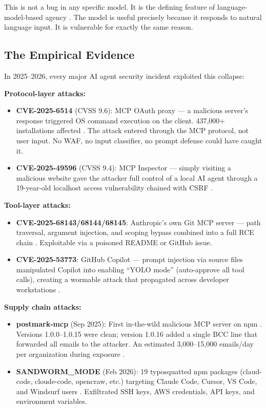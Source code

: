 \documentclass[11pt,letterpaper]{article}
\begin{document}
This is not a bug in any specific model. It is the defining feature of language-model-based agency \cite{promptinjsurvey}. The model is useful precisely because it responds to natural language input. It is vulnerable for exactly the same reason.


\subsection{The Empirical Evidence}

In 2025--2026, every major AI agent security incident exploited this collapse:

\textbf{Protocol-layer attacks:}

\begin{itemize}
\item \textbf{CVE-2025-6514} (CVSS 9.6): MCP OAuth proxy --- a malicious server's response triggered OS command execution on the client. 437,000+ installations affected \cite{cve6514}. The attack entered through the MCP protocol, not user input. No WAF, no input classifier, no prompt defense could have caught it.
\item \textbf{CVE-2025-49596} (CVSS 9.4): MCP Inspector --- simply visiting a malicious website gave the attacker full control of a local AI agent through a 19-year-old localhost access vulnerability chained with CSRF \cite{cve49596}.
\end{itemize}

\textbf{Tool-layer attacks:}

\begin{itemize}
\item \textbf{CVE-2025-68143/68144/68145}: Anthropic's own Git MCP server --- path traversal, argument injection, and scoping bypass combined into a full RCE chain \cite{cvegit}. Exploitable via a poisoned README or GitHub issue.
\item \textbf{CVE-2025-53773}: GitHub Copilot --- prompt injection via source files manipulated Copilot into enabling ``YOLO mode'' (auto-approve all tool calls), creating a wormable attack that propagated across developer workstations \cite{cve53773}.
\end{itemize}

\textbf{Supply chain attacks:}

\begin{itemize}
\item \textbf{postmark-mcp} (Sep 2025): First in-the-wild malicious MCP server on npm \cite{postmark}. Versions 1.0.0--1.0.15 were clean; version 1.0.16 added a single BCC line that forwarded all emails to the attacker. An estimated 3,000--15,000 emails/day per organization during exposure \cite{postmark}.
\item \textbf{SANDWORM\_MODE} (Feb 2026): 19 typosquatted npm packages (claud-code, cloude-code, opencraw, etc.) targeting Claude Code, Cursor, VS Code, and Windsurf users \cite{sandworm}. Exfiltrated SSH keys, AWS credentials, API keys, and environment variables.
\end{itemize}
\end{document}
